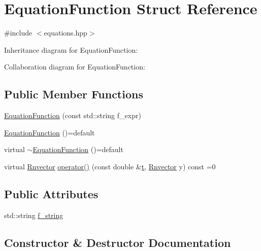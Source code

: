 \hypertarget{structEquationFunction}{}\section{Equation\+Function Struct Reference}
\label{structEquationFunction}


{\ttfamily \#include $<$equations.\+hpp$>$}



Inheritance diagram for Equation\+Function\+:


Collaboration diagram for Equation\+Function\+:
\subsection*{Public Member Functions}
\begin{DoxyCompactItemize}
\item 
\hyperlink{structEquationFunction_a7383ee64812c81fcb46ad0ccd20bac3b}{Equation\+Function} (const std\+::string f\+\_\+expr)
\item 
\hyperlink{structEquationFunction_ac20bd62157e75f9fb76a6de704f98ae2}{Equation\+Function} ()=default
\item 
virtual \hyperlink{structEquationFunction_a1d7e9440f0578cd6e60de92a4c9bbb2c}{$\sim$\+Equation\+Function} ()=default
\item 
virtual \hyperlink{utils_8hpp_a8e0cccfe9e5cee5140bfcfbd9a3a6a0e}{Rnvector} \hyperlink{structEquationFunction_ade0f7a750ab9e61eea68636ced6dc1b7}{operator()} (const double \&\hyperlink{check__solution_8m_a4bf63048c1b89f72b7a4ffe0f862c6de}{t}, \hyperlink{utils_8hpp_a8e0cccfe9e5cee5140bfcfbd9a3a6a0e}{Rnvector} y) const =0
\end{DoxyCompactItemize}
\subsection*{Public Attributes}
\begin{DoxyCompactItemize}
\item 
std\+::string \hyperlink{structEquationFunction_a21ef5c7c24a9d4539d150479a07eea32}{f\+\_\+string}
\end{DoxyCompactItemize}


\subsection{Constructor \& Destructor Documentation}
\mbox{\label{structEquationFunction_a7383ee64812c81fcb46ad0ccd20bac3b}} 
